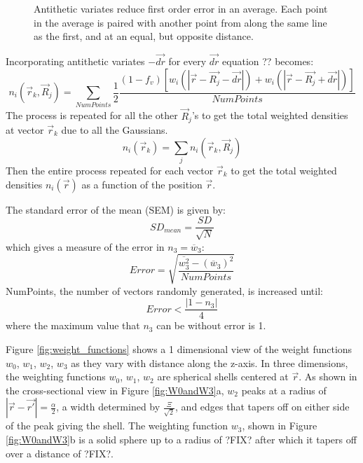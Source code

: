 \documentclass[double,12pt]{beavtex}
\begin{document}
 \begin{figure}[h!]
    \centering
    \caption{Antithetic variates reduce first order error in an average. Each point in the average is paired with another point from along the same line as the first, and at an equal, but opposite distance.}
    \label{fig:AntitheticVariate}
  \end{figure} 
Incorporating antithetic variates $-\vec{dr}$ for every $\vec{dr}$ equation ?? becomes:
\begin{displaymath}{n_i(\vec{r}_k, \vec{R}_j)=\sum_{NumPoints}\frac{1}{2}\frac{(1-f_v)\left[w_i(|\vec{r}-\vec{R_j}-\vec{dr}|) +w_i(|\vec{r}-\vec{R_j}+\vec{dr}|)\right]}{NumPoints}}\end{displaymath}   The process is repeated for all the other $\vec{R}_j$'s to get the total weighted densities at vector $\vec{r}_k$ due to all the Gaussians. 
\begin{displaymath}{n_i(\vec{r}_k)=\sum_j{n_i(\vec{r}_k, \vec{R}_j)}}\end{displaymath}
Then the entire process repeated for each vector $\vec{r}_k$ to get the total weighted densities $n_i(\vec{r})$ as a function of the position $\vec{r}$. 

The standard error of the mean (SEM) is given by:
\begin{equation}{SD_{mean}=\frac{SD}{\sqrt{N}}}\end{equation} which gives a measure of the error in $n_3=\overline{w}_3$:
\begin{equation}{Error=\sqrt{\frac{\overline{w_3^2}-(\overline{w}_3)^2}{NumPoints}}}\end{equation} NumPoints, the number of vectors randomly generated, is increased until:
\begin{equation}{Error<\frac{|1-n_3|}{4}}\end{equation} where the maximum value that $n_3$ can be without error is 1.

Figure \ref{fig:weight_functions} shows a 1 dimensional view of the weight functions 
$w_0$, $w_1$, $w_2$, $w_3$ as they vary with distance along the z-axis. In three 
dimensions, the weighting functions $w_0$, $w_1$, $w_2$ are spherical shells 
centered at $\vec{r}$. As shown in the cross-sectional view in Figure \ref{fig:W0andW3}a, 
$w_2$ peaks at a radius of $|\vec{r}-\vec{r'}|=\frac{\alpha}{2}$, a width determined 
by $\frac{\Xi}{\sqrt{2}}$, and edges that tapers off on either side of the peak giving 
the shell. The weighting function $w_3$, shown in Figure \ref{fig:W0andW3}b is a solid 
sphere up to a radius of ?FIX? after which it tapers off over a distance of ?FIX?.
\end{document}
